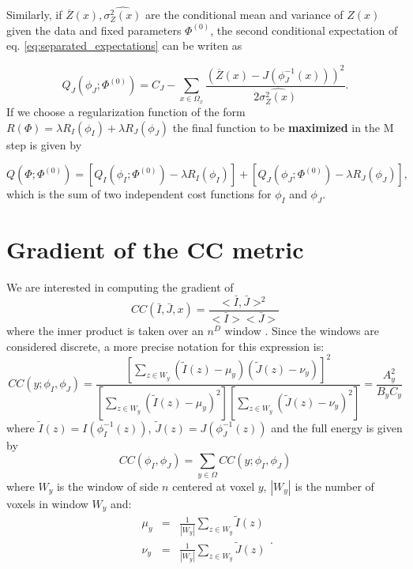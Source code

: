 Similarly, if $\overline{Z}(x), \widehat{\sigma^{2}_{Z}(x)}$ are the conditional mean and variance of $Z(x)$ given the data
and fixed parameters $\Phi^{(0)}$, the second conditional expectation of eq. \eqref{eq:separated_expectations} can be writen as

\begin{equation}
    Q_{J}(\phi_{J}; \Phi^{(0)}) = C_{J} - \sum_{x\in\Omega_{x}}\frac{(\overline{Z}(x) - J(\phi^{-1}_{J}(x)))^{2}}{2\widehat{\sigma^{2}_{Z}(x)}}.
\end{equation}
If we choose a regularization function of the form $R(\Phi) = \lambda R_{I}(\phi_{I}) + \lambda R_{J}(\phi_{J})$ the final function to be \textbf{maximized} in the M step is given by

\begin{equation}
    Q(\Phi; \Phi^{(0)}) = \left[Q_{I}(\phi_{I}; \Phi^{(0)}) - \lambda R_{I}(\phi_{I})\right] + \left[Q_{J}(\phi_{J}; \Phi^{(0)}) - \lambda R_{J}(\phi_{J})\right],
\end{equation}
which is the sum of two independent cost functions for $\phi_{I}$ and $\phi_{J}$.

\section{Gradient of the CC metric}\label{ap:CC_gradient}
We are interested in computing the gradient of
\begin{equation}
    CC(\bar{I}, \bar{J}, x) = \frac{<\bar{I}, \bar{J}>^{2}}{<\bar{I}><\bar{J}>}
\end{equation}
where the inner product is taken over an $n^{D}$ window \citep[see][eq. 4]{Avants2008}. Since the windows are considered discrete, a more precise notation
for this expression is:
\begin{equation}\label{eq:CC_definition}
    CC(y;\phi_{I}, \phi_{J}) = \frac{\left[\sum_{z\in W_{y}} \left(\tilde{I}(z) - \mu_{y}\right)\left(\tilde{J}(z) - \nu_{y}\right)\right]^{2}}
    {\left[\sum_{z \in W_{y}}\left(\tilde{I}(z) - \mu_{y}\right)^{2}\right] \left[\sum_{z \in W_{y}}\left(\tilde{J}(z) - \nu_{y}\right)^{2}\right]} = \frac{A_{y}^{2}}{B_{y}C_{y}}
\end{equation}
where $\tilde{I}(z) = I(\phi_{I}^{-1}(z))$, $\tilde{J}(z) = J(\phi_{J}^{-1}(z))$ and the full energy is given by
\begin{equation}
    CC(\phi_{I}, \phi_{J}) = \sum_{y\in\Omega} CC(y; \phi_{I}, \phi_{J})
\end{equation}
where $W_{y}$ is the window of side $n$ centered at voxel $y$, $|W_{y}|$ is the number of voxels in window $W_{y}$ and:
\begin{equation}
    \begin{array}{lll}
        \mu_{y} &=& \frac{1}{|W_{y}|}\sum_{z \in W_{y}}\tilde{I}(z)\\[+2mm]
        \nu_{y} &=& \frac{1}{|W_{y}|}\sum_{z \in W_{y}}\tilde{J}(z)\\
    \end{array}.
\end{equation}

